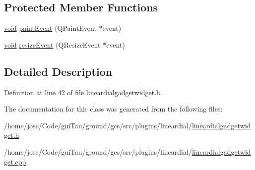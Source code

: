 \subsection*{Protected Member Functions}
\begin{DoxyCompactItemize}
\item 
\hyperlink{group___u_a_v_objects_plugin_ga444cf2ff3f0ecbe028adce838d373f5c}{void} \hyperlink{group___linear_dial_plugin_ga80239da240f9678e9cf4d2de3d9f6568}{paint\-Event} (Q\-Paint\-Event $\ast$event)
\item 
\hyperlink{group___u_a_v_objects_plugin_ga444cf2ff3f0ecbe028adce838d373f5c}{void} \hyperlink{group___linear_dial_plugin_ga6f18ff48bf1851067cbd13d56f04fd73}{resize\-Event} (Q\-Resize\-Event $\ast$event)
\end{DoxyCompactItemize}


\subsection{Detailed Description}


Definition at line 42 of file lineardialgadgetwidget.\-h.



The documentation for this class was generated from the following files\-:\begin{DoxyCompactItemize}
\item 
/home/jose/\-Code/gui\-Tau/ground/gcs/src/plugins/lineardial/\hyperlink{lineardialgadgetwidget_8h}{lineardialgadgetwidget.\-h}\item 
/home/jose/\-Code/gui\-Tau/ground/gcs/src/plugins/lineardial/\hyperlink{lineardialgadgetwidget_8cpp}{lineardialgadgetwidget.\-cpp}\end{DoxyCompactItemize}
